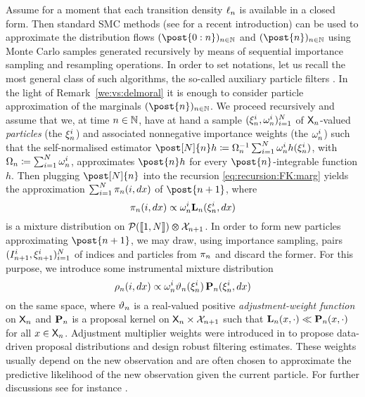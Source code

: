 Assume for a moment that each transition density $\ell_{n}$ is available in a closed form. Then standard SMC methods (see \cite{chopin:papaspiliopoulos:2020} for a recent introduction) can be used to approximate the distribution flows $(\post{0:n})_{n \in \nset}$ and $(\post{n})_{n \in \nset}$ using Monte Carlo samples generated recursively by means of sequential importance sampling and resampling operations. In order to set notations, let us recall the most general class of such algorithms, the so-called auxiliary particle filters \cite{pitt:shephard:1999}. In the light of Remark~\ref{we:vs:delmoral} it is enough to consider particle approximation of the marginals $(\post{n})_{n \in \nset}$. We proceed recursively and assume that we, at time $n \in \mathbb{N}$, have at hand a sample $(\xi_{n}^{i}, \omega_{n}^{i})_{i = 1}^N$ of $\mathsf{X}_n$-valued \emph{particles} (the $\xi_{n}^{i}$) and associated nonnegative importance weights (the $\omega_{n}^{i}$) such that the self-normalised estimator $\post[\N]{n} h \eqdef \sumwght{n}^{-1} \sum_{i = 1}^\N \ewght{n}{i} h(\epart{n}{i})$, with $\sumwght{n} \eqdef \sum_{i = 1}^\N \ewght{n}{i}$, approximates $\post{n} h$ for every $\post{n}$-integrable function $h$. Then plugging $\post[\N]{n}$ into the recursion \eqref{eq:recursion:FK:marg} yields the approximation $\sum_{i = 1}^N \pi_n(i, d x)$ of $\post{n + 1}$, where 
\begin{equation} \label{eq:def:partmixt}
\partmixt_n(i, \rmd x) \propto \ewght{n}{i} \uk{n}(\epart{n}{i}, \rmd x)
\end{equation}
is a mixture distribution on $\mathcal{P}(\llbracket 1, N \rrbracket) \varotimes \mathcal{X}_{n + 1}$. In order to form new particles approximating $\post{n + 1}$, we may draw, using importance sampling, pairs $(I_{n + 1}^{i}, \xi_{n + 1}^{i})_{i = 1}^N$ of indices and particles from $\pi_n$ and discard the former. For this purpose, we introduce some instrumental mixture distribution 
\begin{equation} \label{eq:cond:instrumental:mixture}
\rho_n(i, \rmd x) \propto \ewght{n}{i} \adjfuncforward{n}(\epart{n}{i}) \, \prop{n}(\epart{n}{i}, \rmd x)
\end{equation}
on the same space, where $\vartheta_{n}$ is a real-valued positive \emph{adjustment-weight function} on $\mathsf{X}_n$ and $\mathbf{P}_{n}$ is a proposal kernel on $\mathsf{X}_n \times \mathcal{X}_{n + 1}$ such that $\mathbf{L}_{n}(x, \cdot) \ll \mathbf{P}_{n}(x, \cdot)$ for all $x \in \mathsf{X}_n$. Adjustment multiplier weights were introduced in \cite{pitt:shephard:1999} to propose data-driven proposal distributions and design robust filtering estimates. These weights usually depend on the new observation and are often chosen to approximate the predictive likelihood of the new observation given the current particle. For further discussions see for instance \cite[Chapter~8]{Cappe:2005:IHM:1088883}.

